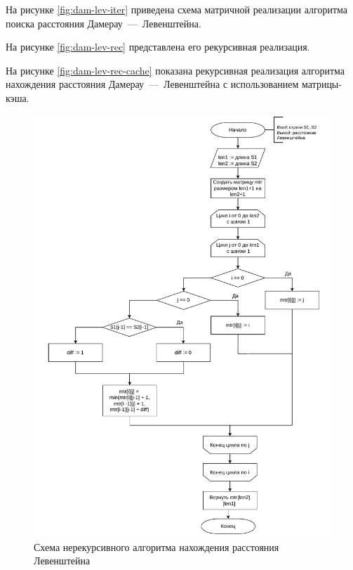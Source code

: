 На рисунке \ref{fig:dam-lev-iter} приведена схема матричной реализации алгоритма поиска расстояния Дамерау~---~Левенштейна.

На рисунке \ref{fig:dam-lev-rec} представлена его рекурсивная реализация.

На рисунке \ref{fig:dam-lev-rec-cache} показана рекурсивная реализация алгоритма нахождения расстояния Дамерау~---~Левенштейна с использованием матрицы-кэша.
\begin{figure}[h]
	\centering
	\includegraphics[height=0.7\textheight, page=1]{algo-scheme.pdf}
	\caption{Схема нерекурсивного алгоритма нахождения расстояния Левенштейна}
	\label{fig:lev-iter}
\end{figure}

\clearpage

